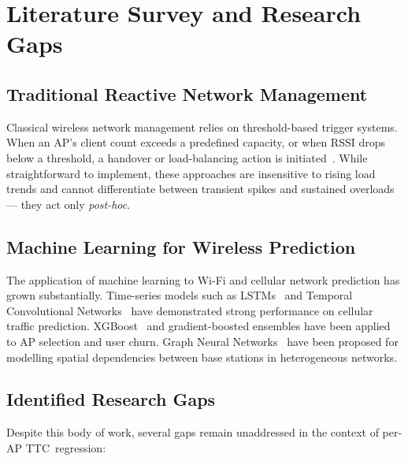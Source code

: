 \documentclass[12pt,a4paper]{article}
\newcommand{\ttc}{\textsc{TTC}}
\begin{document}
\section{Literature Survey and Research Gaps}
\label{sec:litsurvey}

\subsection{Traditional Reactive Network Management}

Classical wireless network management relies on threshold-based trigger systems. When an AP's client count exceeds a predefined capacity, or when RSSI drops below a threshold, a handover or load-balancing action is initiated~\cite{3gpp_ts36}. While straightforward to implement, these approaches are insensitive to rising load trends and cannot differentiate between transient spikes and sustained overloads — they act only \emph{post-hoc}.

\subsection{Machine Learning for Wireless Prediction}

The application of machine learning to Wi-Fi and cellular network prediction has grown substantially. Time-series models such as LSTMs~\cite{hochreiter1997lstm} and Temporal Convolutional Networks~\cite{bai2018tcn} have demonstrated strong performance on cellular traffic prediction. XGBoost~\cite{chen2016xgboost} and gradient-boosted ensembles have been applied to AP selection and user churn. Graph Neural Networks~\cite{kipf2017gcn} have been proposed for modelling spatial dependencies between base stations in heterogeneous networks.

\subsection{Identified Research Gaps}

Despite this body of work, several gaps remain unaddressed in the context of per-AP \ttc\ regression:
\end{document}
